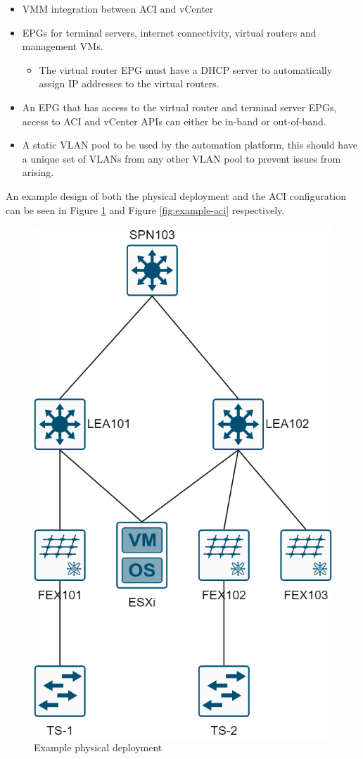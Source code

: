 \begin{itemize}
    \item VMM integration between ACI and vCenter
    \item EPGs for terminal servers, internet connectivity, virtual routers and management VMs.
          \begin{itemize}
              \item The virtual router EPG must have a DHCP server to automatically assign IP addresses to the virtual routers.
          \end{itemize}
    \item An EPG that has access to the virtual router and terminal server EPGs, access to ACI and vCenter APIs can either be in-band or out-of-band.
    \item A static VLAN pool to be used by the automation platform, this should have a unique set of VLANs from any other VLAN pool to prevent issues from arising.
\end{itemize}

An example design of both the physical deployment and the ACI configuration can be seen in Figure \ref{fig:example-deployment} and Figure \ref{fig:example-aci} respectively.

\begin{figure}[H]
    \centering
    \includegraphics[width=0.5\linewidth]{images/aci-topology.png}
    \caption{Example physical deployment}
    \label{fig:example-deployment}
\end{figure}

